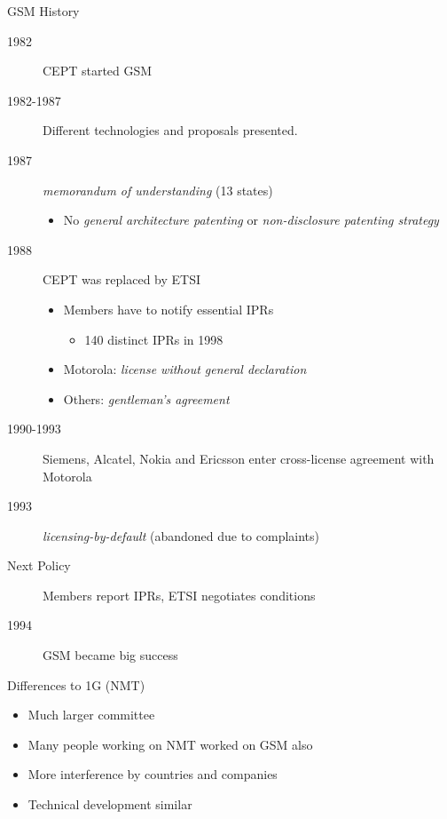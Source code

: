\begin{frame}{GSM History}
  \begin{description}
    \item[1982] CEPT started GSM %
    \item[1982-1987] Different technologies and proposals presented.
    \item[1987] \emph{memorandum of understanding} (13 states)
    \begin{itemize}
      \item No \emph{general architecture patenting} or \emph{non-disclosure patenting strategy}
    \end{itemize}
    \item[1988] CEPT was replaced by ETSI %
    \begin{itemize}
      \item Members have to notify essential IPRs
      \begin{itemize}
        \item 140 distinct IPRs in 1998
      \end{itemize} 
      \item Motorola: \emph{license without general declaration}
      \item Others: \emph{gentleman's agreement}
    \end{itemize}
    \item[1990-1993] Siemens, Alcatel, Nokia and Ericsson enter cross-license agreement with Motorola
    \item[1993] \emph{licensing-by-default} (abandoned due to complaints)
    \item[Next Policy] Members report IPRs, ETSI negotiates conditions
    \item[1994] GSM became big success
  \end{description}
\end{frame}

\begin{frame}{Differences to 1G (NMT)}
  \begin{itemize}
    \item Much larger committee
    \item Many people working on NMT worked on GSM also 
    \item More interference by countries and companies
    \item Technical development similar
  \end{itemize}
\end{frame}

